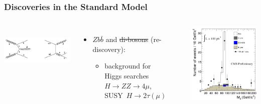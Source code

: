 \documentclass[compress]{beamer}
\begin{document}
\begin{frame}
\frametitle{Discoveries in the Standard Model}

\vfill
\begin{columns}

\mbox{ } \hfill \includegraphics[width=0.65\linewidth]{Zbb_diagrams.png} \hfill \mbox{ }

\vspace{-0.25 cm}
\begin{itemize}
\item $Zb\bar{b}$ and \sout{di-bosons} (re-discovery):
\begin{itemize}
\item background for Higgs searches \\ $H \to Z Z \to 4\mu$, \mbox{SUSY $H \to 2\tau (\mu)$\hspace{-1 cm}}
\end{itemize}
\end{itemize}

\vspace{0.8 cm}
\mbox{ }

\includegraphics[width=0.95\linewidth]{Zbb_100pb-1.png}
\end{columns}


\end{frame}
\end{document}
